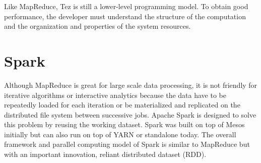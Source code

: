 \documentclass[11pt]{book}
\begin{document}
Like MapReduce, Tez is still a lower-level programming model. To obtain good performance, the developer must understand the structure of the computation and the organization and properties of the system resources. 

\section[Spark]
{Spark}
 Although MapReduce is great for large scale data processing, it is not friendly for iterative algorithms or interactive analytics because the data have to be repeatedly loaded for each iteration or be materialized and replicated on the distributed file system between successive jobs. Apache Spark \cite{Zaharia:2010:SCC, Zaharia:2012:RDD, Spark} is designed to solve this problem by reusing the working dataset. Spark was built on top of Mesos initially but can also run on top of YARN or standalone today. The overall framework and parallel computing model of Spark is similar to MapReduce but with an important innovation, reliant distributed dataset (RDD).
\end{document}
